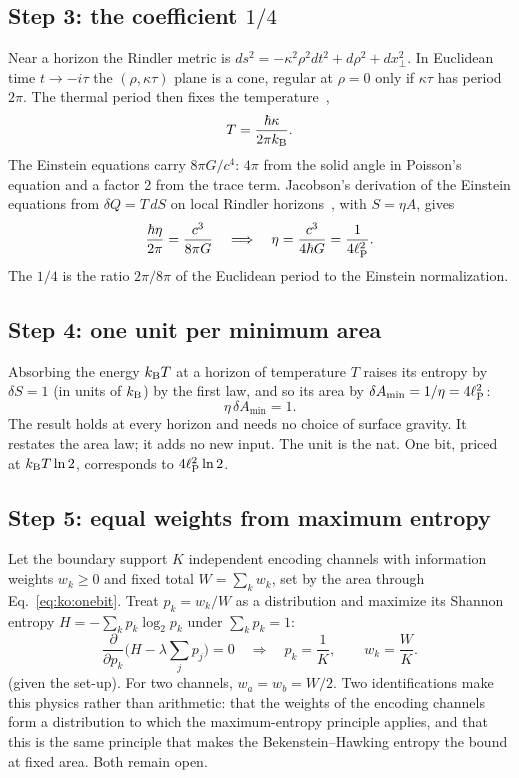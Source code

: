 \subsection{Step 3: the coefficient $1/4$}
Near a horizon the Rindler metric is $ds^2=-\kappa^2\rho^2dt^2+d\rho^2+dx_\perp^2$. In Euclidean time $t\to-i\tau$ the $(\rho,\kappa\tau)$ plane is a
cone, regular at $\rho=0$ only if $\kappa\tau$ has period $2\pi$. The thermal period then fixes the temperature~\cite{Unruh1976,BisognanoWichmann1976},
\begin{equation}
T=\frac{\hbar\kappa}{2\pi k_{\mathrm B}}.\label{eq:ko:TU}
\end{equation}
The Einstein equations carry $8\pi G/c^4$: $4\pi$ from the solid angle in Poisson's equation and a factor 2 from the trace term. Jacobson's derivation
of the Einstein equations from $\delta Q=T\,dS$ on local Rindler horizons~\cite{Jacobson1995}, with $S=\eta A$, gives
\begin{equation}
\frac{\hbar\eta}{2\pi}=\frac{c^3}{8\pi G}\quad\Longrightarrow\quad\eta=\frac{c^3}{4\hbar G}=\frac1{4\ell_{\mathrm P}^2}.\label{eq:ko:eta}
\end{equation}
\derived{} The $1/4$ is the ratio $2\pi/8\pi$ of the Euclidean period to the Einstein normalization.

\subsection{Step 4: one unit per minimum area}
Absorbing the energy $k_{\mathrm B} T$ at a horizon of temperature $T$ raises its entropy by $\delta S=1$ (in units of $k_{\mathrm B}$) by the first law, and so its
area by $\delta A_{\min}=1/\eta=4\ell_{\mathrm P}^2$:
\begin{equation}
\eta\,\delta A_{\min}=1.\label{eq:ko:onebit}
\end{equation}
\derived{} The result holds at every horizon and needs no choice of surface gravity. It restates the area law; it adds no new input. The unit is
the nat. One bit, priced at $k_{\mathrm B} T\ln2$, corresponds to $4\ell_{\mathrm P}^2\ln2$. \derived

\subsection{Step 5: equal weights from maximum entropy}
Let the boundary support $K$ independent encoding channels with information weights $w_k\ge0$ and fixed total $W=\sum_kw_k$, set by the area
through Eq.~\eqref{eq:ko:onebit}. Treat $p_k=w_k/W$ as a distribution and maximize its Shannon entropy $H=-\sum_kp_k\log_2p_k$ under
$\sum_kp_k=1$:
\begin{equation}
\frac{\partial}{\partial p_k}\Big(H-\lambda\sum_jp_j\Big)=0\quad\Longrightarrow\quad p_k=\frac1K,\qquad w_k=\frac WK.\label{eq:ko:maxent}
\end{equation}
\derived{} (given the set-up). For two channels, $w_a=w_b=W/2$. Two identifications make this physics rather than arithmetic: that the
weights of the encoding channels form a distribution to which the maximum-entropy principle applies, and that this is the same principle that
makes the Bekenstein--Hawking entropy the bound at fixed area. Both remain open. \conjecture

